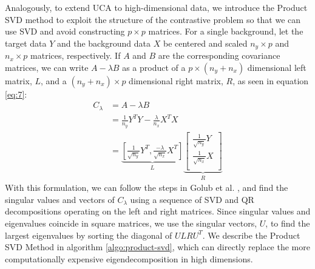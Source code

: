 \documentclass[nocrop]{bioinfo}
\begin{document}
\begin{methods}
Analogously, to extend UCA to high-dimensional data, we introduce the Product SVD method to exploit the structure of the contrastive problem so that we can use SVD and avoid constructing $p \times p$ matrices. For a single background, let the target data $Y$ and the background data $X$ be centered and scaled $n_y \times p$ and $n_x \times p$ matrices, respectively. If $A$ and $B$ are the corresponding covariance matrices, we can write $A - \lambda B$ as a product of a $p \times (n_y + n_x)$ dimensional left matrix, $L$, and a $(n_y + n_x) \times p$ dimensional right matrix, $R$, as seen in equation \ref{eq:7}:
\begin{align}
  C_\lambda &= A - \lambda B \nonumber\\
            &=\frac{1}{n_y}Y^TY -\frac{\lambda}{n_x} X^T X\nonumber \\
            &=  \underbrace{\left[ \frac{1}{\sqrt{n_{y}}}Y^T,  \frac{-\lambda}{\sqrt{n_{x}}} X^T\right]}_{L}\underbrace{\begin{bmatrix*} \frac{1}{\sqrt{n_{y}}}Y \\ \frac{1}{\sqrt{n_{x}}}X \\ \end{bmatrix*}}_{R} \label{eq:7}
\end{align}
With this formulation, we can follow the steps in Golub et al.  \cite{Golub}, and find the singular values and vectors of $C_\lambda$ using a sequence of SVD and QR decompositions operating on the left and right matrices. Since singular values and eigenvalues coincide in square matrices, we use the singular vectors, $U$, to find the largest eigenvalues by sorting the diagonal of $ULRU^T$.  
We describe the Product SVD Method in algorithm \ref{algo:product-svd}, which can directly replace the more computationally expensive eigendecomposition in high dimensions.


\end{methods}
\end{document}
